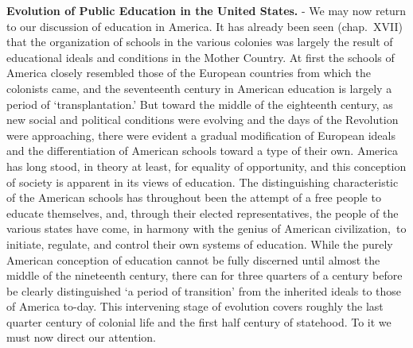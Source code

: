 \documentclass[
]{book}
\begin{document}
\textbf{Evolution of Public Education in the United States.} - We may now return to our discussion of education in America. It has already been seen (chap.~XVII) that the organization of schools in the various colonies was largely the result of educational ideals and conditions in the Mother Country. At first the schools of America closely resembled those of the European countries from which the colonists came, and the seventeenth century in American education is largely a period of `transplantation.' But toward the middle of the eighteenth century, as new social and political conditions were evolving and the days of the Revolution were approaching, there were evident a gradual modification of European ideals and the differentiation of American schools toward a type of their own. America has long stood, in theory at least, for equality of opportunity, and this conception of society is apparent in its views of education. The distinguishing characteristic of the American schools has throughout been the attempt of a free people to educate themselves, and, through their elected representatives, the people of the various states have come, in harmony with the genius of American civilization,~to initiate, regulate, and control their own systems of education. While the purely American conception of education cannot be fully discerned until almost the middle of the nineteenth century, there can for three quarters of a century before be clearly distinguished `a period of transition' from the inherited ideals to those of America to-day. This intervening stage of evolution covers roughly the last quarter century of colonial life and the first half century of statehood. To it we must now direct our attention.
\end{document}
